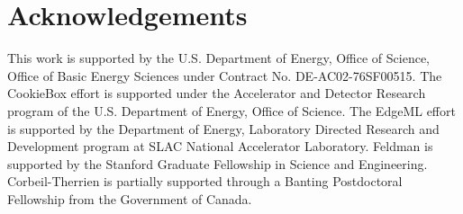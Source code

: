 \documentclass[aps]{revtex4}
\begin{document}



\section*{Acknowledgements}
This work is supported by the U.S. Department of Energy, Office of Science, Office of Basic Energy Sciences under Contract No. DE-AC02-76SF00515.
The CookieBox effort is supported under the Accelerator and Detector Research program of the U.S. Department of Energy, Office of Science.
The EdgeML effort is supported by the Department of Energy, Laboratory Directed Research and Development program at SLAC National Accelerator Laboratory.
Feldman is supported by the Stanford Graduate Fellowship in Science and Engineering.
Corbeil-Therrien is partially supported through a Banting Postdoctoral Fellowship from the Government of Canada.
\end{document}

